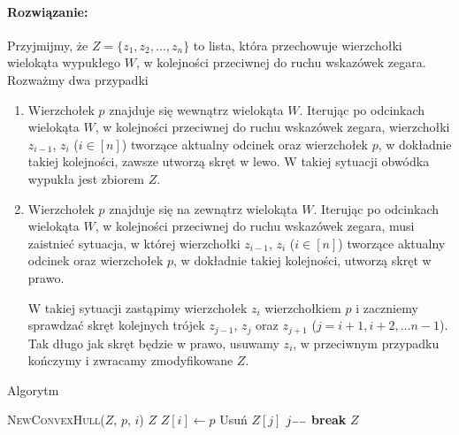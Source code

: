 \paragraph{Rozwiązanie:}
Przyjmijmy, że $Z = \{z_1, z_2, \ldots, z_n\}$ to lista, która przechowuje wierzchołki
wielokąta wypukłego $W$, w kolejności przeciwnej do ruchu wskazówek zegara.
Rozważmy dwa przypadki
\begin{enumerate}
	\item Wierzchołek $p$ znajduje się wewnątrz wielokąta $W$. Iterując po odcinkach
	wielokąta $W$, w kolejności przeciwnej do ruchu wskazówek zegara, wierzchołki
	$z_{i-1}$, $z_i$ ($i \in [n]$) tworzące aktualny odcinek oraz wierzchołek $p$, w dokładnie takiej kolejności, zawsze utworzą skręt w lewo. W takiej sytuacji obwódka wypukła jest zbiorem $Z$.
	
	\item Wierzchołek $p$ znajduje się na zewnątrz wielokąta $W$. Iterując po odcinkach
	wielokąta $W$, w kolejności przeciwnej do ruchu wskazówek zegara, musi zaistnieć sytuacja, w której wierzchołki
	$z_{i-1}$, $z_i$ ($i \in [n]$) tworzące aktualny odcinek oraz wierzchołek $p$, w dokładnie takiej kolejności, utworzą skręt w prawo.
	
	W takiej sytuacji zastąpimy wierzchołek $z_i$ wierzchołkiem $p$ i zaczniemy 
	sprawdzać skręt kolejnych trójek $z_{j-1}$, $z_j$ oraz $z_{j+1}$
	($j = i + 1, i + 2, \dots n - 1$). Tak długo
	jak skręt będzie w prawo, usuwamy $z_i$, w przeciwnym przypadku kończymy i zwracamy zmodyfikowane $Z$.
\end{enumerate}

\begin{algorithm}[H]
	\caption{Algorytm }
	\begin{algorithmic}[1]
		\State \Return \textsc{NewConvexHull}($Z$, $p$, $i$)
		\EndIf
		\EndFor
		\State \Return $Z$
		\EndProcedure		
		\State $Z[i] \gets p$
		\State Usuń $Z[j]$
		\State $j\mm$ 
		\Else
		\State \textbf{break}
		\EndIf
		\EndFor
		\State \Return $Z$
		\EndProcedure
	\end{algorithmic}
\end{algorithm}